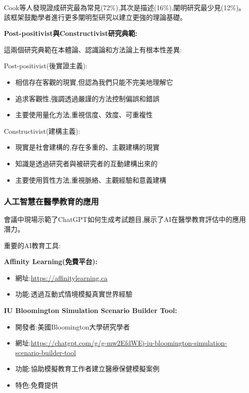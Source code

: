 \documentclass[12pt,a4paper]{article}
\begin{document}
Cook等人發現證成研究最為常見(72\%),其次是描述(16\%),闡明研究最少見(12\%)。該框架鼓勵學者進行更多闡明型研究以建立更強的理論基礎。

\textbf{Post-positivist與Constructivist研究典範:}

這兩個研究典範在本體論、認識論和方法論上有根本性差異:

Post-positivist(後實證主義):
\begin{itemize}[nosep]
    \item 相信存在客觀的現實,但認為我們只能不完美地理解它
    \item 追求客觀性,強調透過嚴謹的方法控制偏誤和錯誤
    \item 主要使用量化方法,重視信度、效度、可重複性
\end{itemize}

Constructivist(建構主義):
\begin{itemize}[nosep]
    \item 現實是社會建構的,存在多重的、主觀建構的現實
    \item 知識是透過研究者與被研究者的互動建構出來的
    \item 主要使用質性方法,重視脈絡、主觀經驗和意義建構
\end{itemize}

\subsubsection{人工智慧在醫學教育的應用}

會議中現場示範了ChatGPT如何生成考試題目,展示了AI在醫學教育評估中的應用潛力。

重要的AI教育工具:

\textbf{Affinity Learning(免費平台):}
\begin{itemize}[nosep]
    \item 網址:\url{https://affinitylearning.ca}
    \item 功能:透過互動式情境模擬真實世界經驗
\end{itemize}

\textbf{IU Bloomington Simulation Scenario Builder Tool:}
\begin{itemize}[nosep]
    \item 開發者:美國Bloomington大學研究學者
    \item 網址:\url{https://chatgpt.com/g/g-mw2EfdWEj-iu-bloomington-simulation-scenario-builder-tool}
    \item 功能:協助模擬教育工作者建立醫療保健模擬案例
    \item 特色:免費提供
\end{itemize}
\end{document}
